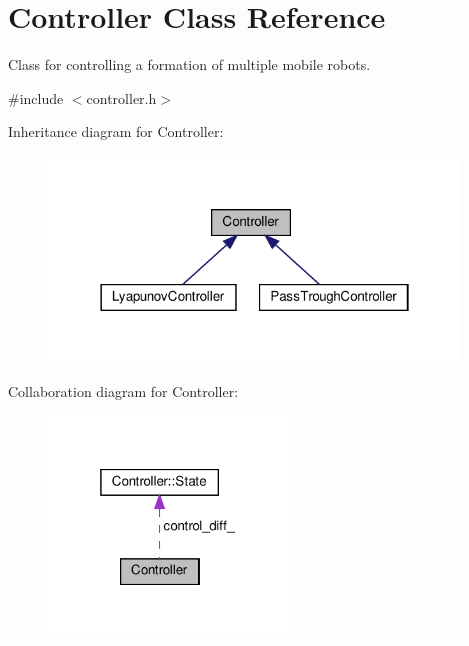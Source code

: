 \hypertarget{classController}{}\section{Controller Class Reference}
\label{classController}


Class for controlling a formation of multiple mobile robots.  




{\ttfamily \#include $<$controller.\+h$>$}



Inheritance diagram for Controller\+:\nopagebreak
\begin{figure}[H]
\begin{center}
\leavevmode
\includegraphics[width=310pt]{dc/d30/classController__inherit__graph}
\end{center}
\end{figure}


Collaboration diagram for Controller\+:\nopagebreak
\begin{figure}[H]
\begin{center}
\leavevmode
\includegraphics[width=181pt]{dd/d93/classController__coll__graph}
\end{center}
\end{figure}
